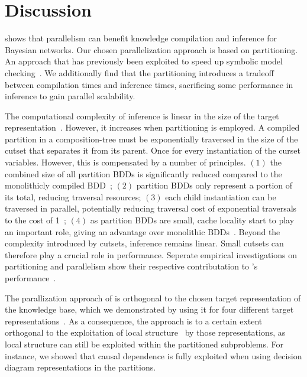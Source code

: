 
\section{Discussion}
\label{sec:conclusion}

\toolname shows that parallelism can benefit knowledge compilation and inference for Bayesian networks. Our chosen parallelization approach is based on partitioning. An approach that has previously been exploited to speed up symbolic model checking~\cite{grumberg2006work,narayan1996partitioned,sahoo2004partitioning}.  We additionally find that the partitioning introduces a tradeoff between compilation times and inference times, sacrificing some performance in inference to gain parallel scalability.

The computational complexity of inference is linear in the size of the target representation~\cite{darwiche2002knowledge}. However, it increases when partitioning is employed. A compiled partition in a composition-tree must be exponentially traversed in the size of the cutset that separates it from its parent. Once for every instantiation of the curset variables. However, this is compensated by a number of principles. $(1)$ the combined size of all partition BDDs is significantly reduced compared to the monolithicly compiled BDD~\cite{dal2017reducing}; $(2)$ partition BDDs only represent a portion of its total, reducing traversal resources; $(3)$ each child instantiation can be traversed in parallel, potentially reducing traversal cost of exponential traversals to the cost of 1~\cite{dal2021compositional}; $(4)$ as partition BDDs are small, cache locality start to play an important role, giving an advantage over monolithic BDDs~\cite{dal2018parallel}. Beyond the complexity introduced by cutsets, inference remains linear. Small cutsets can therefore play a crucial role in performance. Seperate empirical investigations on partitioning and parallelism show their respective contributation to \toolname's performance~\cite{dal2018parallel,dal2021compositional}.



The parallization approach of \toolname is orthogonal to the chosen target representation of the knowledge base, which we demonstrated by using it for four different target representations~\cite{dal2018parallel}. As a consequence, the approach is to a certain extent orthogonal to the exploitation of local structure~\cite{chavira2005compiling} by those representations, as local structure can still be exploited within the partitioned subproblems. For instance, we showed that causal dependence is fully exploited when using decision diagram representations in the partitions.

